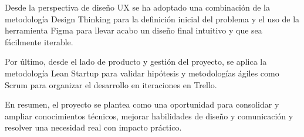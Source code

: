 Desde la perspectiva de diseño UX se ha adoptado una combinación de la metodología Design Thinking para la definición inicial del problema y el uso de la herramienta Figma para llevar acabo un diseño final intuitivo y que sea fácilmente iterable.

Por último, desde el lado de producto y gestión del proyecto, se aplica la metodología Lean Startup para validar hipótesis y metodologías ágiles como Scrum para organizar el desarrollo en iteraciones en Trello.

En resumen, el proyecto se plantea como una oportunidad para consolidar y ampliar conocimientos técnicos, mejorar habilidades de diseño y comunicación y resolver una necesidad real con impacto práctico.
